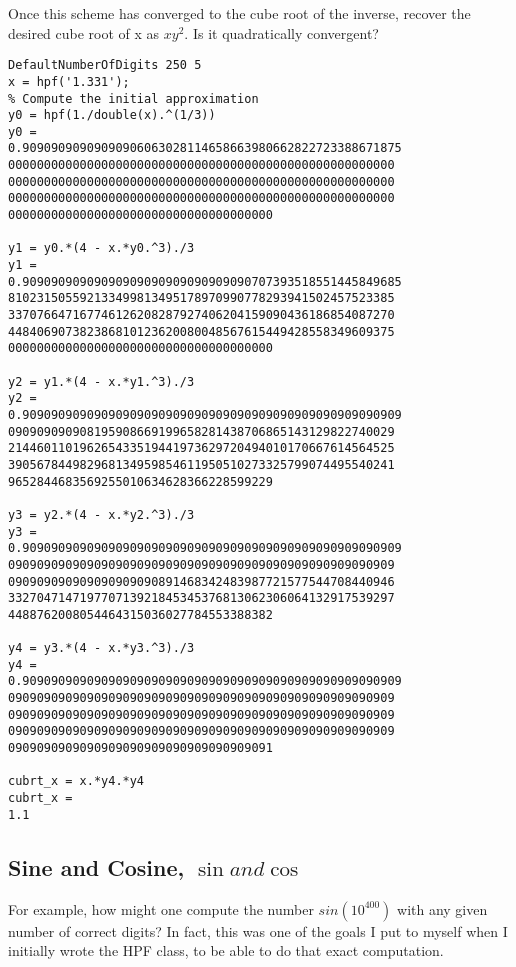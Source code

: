 \documentclass[a4paper,12pt]{article}
\begin{document}
Once this scheme has converged to the cube root of the inverse, recover the desired cube root of x as $x y^{2}$. Is it quadratically convergent?
\vspace{-10pt}
\begin{lstlisting}
DefaultNumberOfDigits 250 5
x = hpf('1.331');
% Compute the initial approximation
y0 = hpf(1./double(x).^(1/3))
y0 =
0.90909090909090906063028114658663980662822723388671875
000000000000000000000000000000000000000000000000000000
000000000000000000000000000000000000000000000000000000
000000000000000000000000000000000000000000000000000000
0000000000000000000000000000000000000

y1 = y0.*(4 - x.*y0.^3)./3
y1 =
0.90909090909090909090909090909090707393518551445849685
810231505592133499813495178970990778293941502457523385
337076647167746126208287927406204159090436186854087270
448406907382386810123620080048567615449428558349609375
0000000000000000000000000000000000000

y2 = y1.*(4 - x.*y1.^3)./3
y2 =
0.90909090909090909090909090909090909090909090909090909
090909090908195908669199658281438706865143129822740029
214460110196265433519441973629720494010170667614564525
390567844982968134959854611950510273325799074495540241
9652844683569255010634628366228599229

y3 = y2.*(4 - x.*y2.^3)./3
y3 =
0.90909090909090909090909090909090909090909090909090909
090909090909090909090909090909090909090909090909090909
090909090909090909090891468342483987721577544708440946
332704714719770713921845345376813062306064132917539297
4488762008054464315036027784553388382

y4 = y3.*(4 - x.*y3.^3)./3
y4 =
0.90909090909090909090909090909090909090909090909090909
090909090909090909090909090909090909090909090909090909
090909090909090909090909090909090909090909090909090909
090909090909090909090909090909090909090909090909090909
0909090909090909090909090909090909091

cubrt_x = x.*y4.*y4
cubrt_x =
1.1
\end{lstlisting}


\subsection{Sine and Cosine, $\sin and \cos$}

For example, how might one compute the number $sin(10^{400})$ with any given number of correct digits? In fact, this was one of the goals I put to myself when I initially wrote the HPF class, to be able to do that exact computation.
\end{document}
